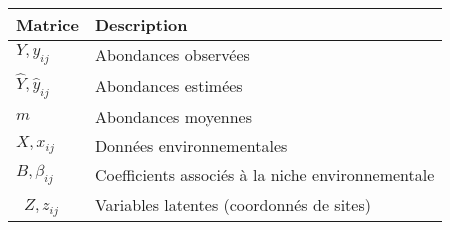 \begin{longtable}[l]{@{}ll@{}}
\toprule
\begin{minipage}[b]{0.34\columnwidth}\raggedright
Matrice\strut
\end{minipage} & \begin{minipage}[b]{0.60\columnwidth}\raggedright
Description\strut
\end{minipage}\tabularnewline
\midrule
\endhead
\begin{minipage}[t]{0.34\columnwidth}\raggedright
\(Y, y_{ij}\)\strut
\end{minipage} & \begin{minipage}[t]{0.60\columnwidth}\raggedright
Abondances observées\strut
\end{minipage}\tabularnewline
\begin{minipage}[t]{0.34\columnwidth}\raggedright
\(\hat{Y}, \hat{y}_{ij}\)\strut
\end{minipage} & \begin{minipage}[t]{0.60\columnwidth}\raggedright
Abondances estimées\strut
\end{minipage}\tabularnewline
\begin{minipage}[t]{0.34\columnwidth}\raggedright
\(m\)\strut
\end{minipage} & \begin{minipage}[t]{0.60\columnwidth}\raggedright
Abondances moyennes\strut
\end{minipage}\tabularnewline
\begin{minipage}[t]{0.34\columnwidth}\raggedright
\(X, x_{ij}\)\strut
\end{minipage} & \begin{minipage}[t]{0.60\columnwidth}\raggedright
Données environnementales\strut
\end{minipage}\tabularnewline
\begin{minipage}[t]{0.34\columnwidth}\raggedright
\(B, \beta_{ij}\)\strut
\end{minipage} & \begin{minipage}[t]{0.60\columnwidth}\raggedright
Coefficients associés à la niche environnementale\strut
\end{minipage}\tabularnewline
\begin{minipage}[t]{0.34\columnwidth}\raggedright
~\(Z, z_{ij}\)\strut
\end{minipage} & \begin{minipage}[t]{0.60\columnwidth}\raggedright
Variables latentes (coordonnés de sites)\strut
\end{minipage}\tabularnewline

\end{longtable}
